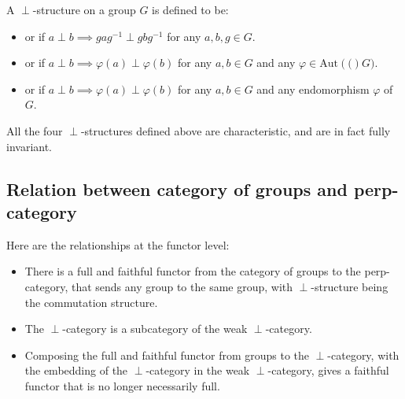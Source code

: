 \documentclass[a4paper]{amsart}
\newcommand{\aut}[1]{\text{Aut}\left(#1\right)}
\begin{document}
\begin{definer}
  A $\perp$-structure on a group $G$ is defined to be:

  \begin{itemize}

  \item {} or
     if $a \perp b \implies
    gag^{-1} \perp gbg^{-1}$ for any $a,b,g \in G$.

  \item {} or
     if $a
    \perp b \implies \varphi(a) \perp \varphi(b)$ for any $a,b \in G$
    and any $\varphi \in \aut(G)$.

  \item {} or
     if $a
    \perp b \implies \varphi(a) \perp \varphi(b)$ for any $a,b \in G$
    and any endomorphism $\varphi$ of $G$.

  \end{itemize}
\end{definer}

All the four $\perp$-structures defined above are characteristic, and
are in fact fully invariant.

\subsection{Relation between category of groups and perp-category}

Here are the relationships at the functor level:

\begin{itemize}

\item There is a full and faithful functor from the category of groups
  to the perp-category, that sends any group to the same group, with
  $\perp$-structure being the commutation structure.

\item The $\perp$-category is a subcategory of the weak
  $\perp$-category.

\item Composing the full and faithful functor from groups to the
  $\perp$-category, with the embedding of the $\perp$-category in the
  weak $\perp$-category, gives a faithful functor that is no longer
  necessarily full.
\end{itemize}
\end{document}
